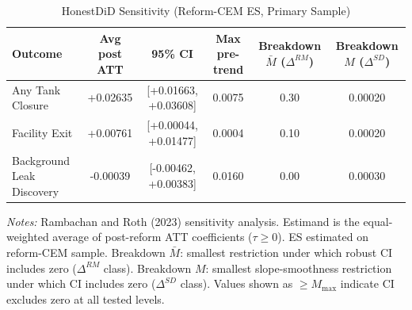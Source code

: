 \begin{table}[htbp]
\centering
\caption{HonestDiD Sensitivity (Reform-CEM ES, Primary Sample)}
\label{tab:honestdid_fac}
\begin{tabular}{l c c c cc}
\toprule
Outcome & Avg post ATT & 95\% CI & Max pre-trend & Breakdown $\bar{M}$ ($\Delta^{RM}$) & Breakdown $M$ ($\Delta^{SD}$) \\
\midrule
Any Tank Closure & +0.02635 & [+0.01663, +0.03608] & 0.0075 & 0.30 & 0.00020 \\
Facility Exit & +0.00761 & [+0.00044, +0.01477] & 0.0004 & 0.10 & 0.00020 \\
Background Leak Discovery & -0.00039 & [-0.00462, +0.00383] & 0.0160 & 0.00 & 0.00030 \\
\bottomrule
\end{tabular}
\begin{minipage}{\linewidth}
\small
\textit{Notes:} Rambachan and Roth (2023) sensitivity analysis. Estimand is the equal-weighted average of post-reform ATT coefficients ($\tau \geq 0$). ES estimated on reform-CEM sample. Breakdown $\bar{M}$: smallest restriction under which robust CI includes zero ($\Delta^{RM}$ class). Breakdown $M$: smallest slope-smoothness restriction under which CI includes zero ($\Delta^{SD}$ class). Values shown as $\geq M_{\max}$ indicate CI excludes zero at all tested levels.
\end{minipage}
\end{table}
